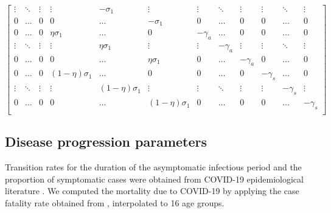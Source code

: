 {\begin{equation}
\begin{bmatrix}
\vdots & \ddots & \vdots &\vdots & -\sigma_1  & \vdots & \vdots & \ddots  & \vdots & \vdots & \ddots & \vdots\\
0 & \dots & 0  & 0 & \dots &-\sigma_1   & 0 & \dots & 0 & 0 & \dots & 0 \\ 
0 & \dots & 0  & \eta\sigma_1  & \dots & 0  & -\gamma_a & \dots & 0  & 0 & \dots & 0  \\
\vdots & \ddots & \vdots & \vdots & \eta\sigma_1  & \vdots & \vdots &  -\gamma_a & \vdots & \vdots & \ddots & \vdots\\
0 & \dots & 0  & 0 & \dots &  \eta\sigma_1 & 0 & \dots &  -\gamma_a  & 0 & \dots & 0  \\ 
0 & \dots & 0  &   (1 - \eta)\sigma_1 & \dots & 0  &  0 & \dots & 0  &  -\gamma_s & \dots & 0  \\
\vdots & \ddots & \vdots & \vdots &  (1 - \eta)\sigma_1 & \vdots & \vdots & \ddots & \vdots & \vdots &  -\gamma_s & \vdots\\
0 & \dots & 0  &  0 & \dots & (1 - \eta)\sigma_1 & 0 & \dots & 0  & 0 & \dots &  -\gamma_s  \\ 
\end{bmatrix}
\label{Sigmaeqn}
\end{equation}}
\normalsize
\subsection{Disease progression parameters}

Transition rates for the duration of the asymptomatic infectious period and the proportion of symptomatic cases were obtained from COVID-19 epidemiological literature \cite{nishiura2020serial,lauer2020incubation,tindale2020transmission}.  We computed the mortality due to COVID-19 by applying the case fatality rate obtained from \cite{publichealthontario}, interpolated to 16 age groups.

